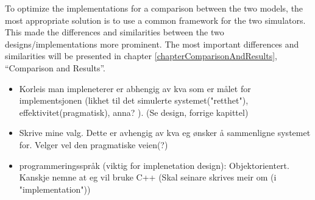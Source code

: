 \documentclass[b5paper,11 pt]{report}
\begin{document}
	To optimize the implementations for a comparison between the two models, the most appropriate solution is to use a common framework for the two simulators.
	This made the differences and similarities between the two designs/implementations more prominent. %
	The most important differences and similarities will be presented in chapter \ref{chapterComparisonAndResults}, ``Comparison and Results''. %

	\begin{itemize}
		\item Korleis man impleneterer er abhengig av kva som er målet for implementsjonen (likhet til det simulerte systemet("retthet"), effektivitet(pragmatisk), anna? ). (Se design, forrige kapittel)%
		\item Skrive mine valg. Dette er avhengig av kva eg ønsker å sammenligne systemet for. Velger vel den pragmatiske veien(?)
		\item programmeringsspråk (viktig for implenetation design): Objektorientert. Kanskje nemne at eg vil bruke C++ (Skal seinare skrives meir om (i "implementation"))
	\end{itemize}


	
\end{document}
